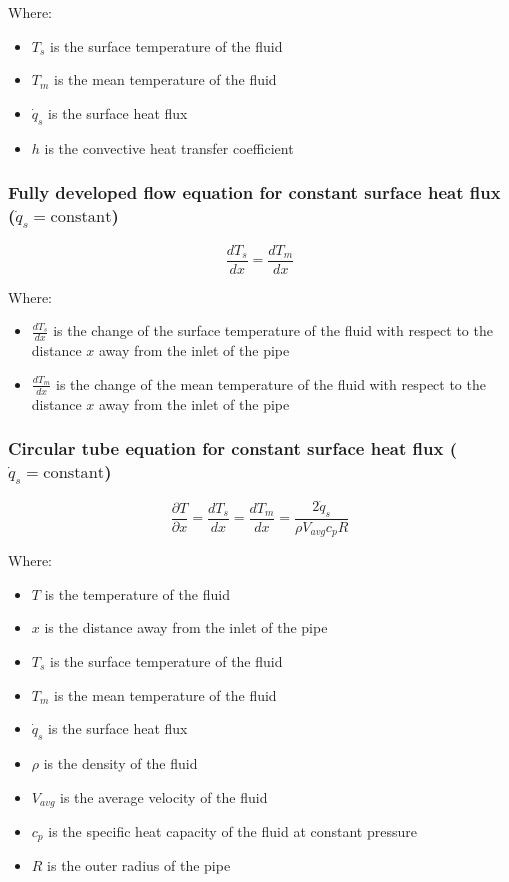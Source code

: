 \documentclass[11pt]{article}
\begin{document}
Where:
\begin{itemize}
\item \(T_s\) is the surface temperature of the fluid
\item \(T_m\) is the mean temperature of the fluid
\item \(\dot{q}_s\) is the surface heat flux
\item \(h\) is the convective heat transfer coefficient
\end{itemize}

\subsubsection{Fully developed flow equation for constant surface heat flux (\(\dot{q}_s = \text{constant}\))}
\label{sec:orgb052bb6}
\[\frac{dT_s}{dx} = \frac{dT_m}{dx}\]

Where:
\begin{itemize}
\item \(\frac{dT_s}{dx}\) is the change of the surface temperature of the fluid with respect to the distance \(x\) away from the inlet of the pipe
\item \(\frac{dT_m}{dx}\) is the change of the mean temperature of the fluid with respect to the distance \(x\) away from the inlet of the pipe
\end{itemize}

 \newpage

\subsubsection{Circular tube equation for constant surface heat flux (\(\dot{q}_s = \text{constant}\))}
\label{sec:org006b554}
\[\frac{\partial T}{\partial x} = \frac{dT_s}{dx} = \frac{dT_m}{dx} = \frac{2 \dot{q}_s}{\rho V_{avg} c_p R}\]

Where:
\begin{itemize}
\item \(T\) is the temperature of the fluid
\item \(x\) is the distance away from the inlet of the pipe
\item \(T_s\) is the surface temperature of the fluid
\item \(T_m\) is the mean temperature of the fluid
\item \(\dot{q}_s\) is the surface heat flux
\item \(\rho\) is the density of the fluid
\item \(V_{avg}\) is the average velocity of the fluid
\item \(c_p\) is the specific heat capacity of the fluid at constant pressure
\item \(R\) is the outer radius of the pipe
\end{itemize}
\end{document}
